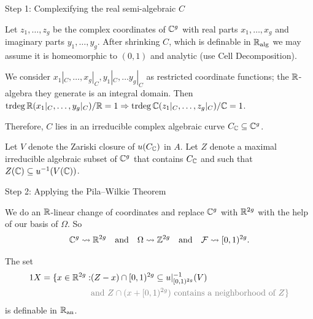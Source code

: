 \documentclass{beamer}
\begin{document}
\begin{frame}{Step 1: Complexifying the real semi-algebraic $C$}
  
  Let $z_1,\ldots,z_g$ be the complex coordinates of ${\mathbb{C}}^g$ with real
  parts $x_1,\ldots,x_g$ and imaginary parts $y_1,\ldots,y_g$. 
  After shrinking $C$, which is definable in
  ${\mathbb{R}}_{\mathrm{alg}}$ we may assume it is homeomorphic to
  $(0,1)$ and analytic (use Cell Decomposition).

  We consider $x_1|_{C},\ldots,{x_g}|_C,{y_1}|_C,\ldots
  y_g|_{C}$ as restricted coordinate functions; the ${\mathbb{R}}$-algebra they
  generate is an integral domain.
  Then
  $\mathrm{trdeg}\,{\mathbb{R}}({x_1}|_C,\ldots,{y_g}|_C)/{\mathbb{R}}=1\Rightarrow
  \mathrm{trdeg}\,{\mathbb{C}}({z_1}|_C,\ldots,{z_g}|_C)/{\mathbb{C}}=1$.

  Therefore, $C$
  lies in an irreducible complex algebraic curve $C_{{\mathbb{C}}}\subseteq{\mathbb{C}}^g$. 

  Let $V$ denote the Zariski closure of $u(C_{\mathbb{C}})$ in $A$. Let $Z$
  denote a maximal irreducible algebraic subset of ${\mathbb{C}}^g$ that contains $C_{{\mathbb{C}}}$
  and such that $Z({\mathbb{C}})\subseteq u^{-1}(V({\mathbb{C}}))$. 
\end{frame}

\begin{frame}{Step 2: Applying the Pila--Wilkie Theorem}


  We do an ${\mathbb{R}}$-linear change of coordinates and
  replace ${\mathbb{C}}^g$ with ${\mathbb{R}}^{2g}$ with the help of our basis of
  $\Omega$. So
  \begin{equation*}
    {\mathbb{C}}^g\leadsto {\mathbb{R}}^{2g}\quad\text{and}\quad
    \Omega \leadsto {\mathbb{Z}}^{2g} \quad\text{and}\quad {\mathcal F} \leadsto
    [0,1)^{2g}.
  \end{equation*}  

  The set
  \begin{alignat*}1  
    X =  \{x \in\IR^{2g} : & (Z-x)\cap [0,1)^{2g} \subset u|_{[0,1)^{2g}}^{-1}(V)\\
    &\color{gray}{\text{and } Z\cap(x+[0,1)^{2g})\text{ contains a
        neighborhood of $Z$}}
    \}
  \end{alignat*}
  is definable in ${{\mathbb{R}}_{\mathrm{an}}}$.
   
\end{frame}
\end{document}
